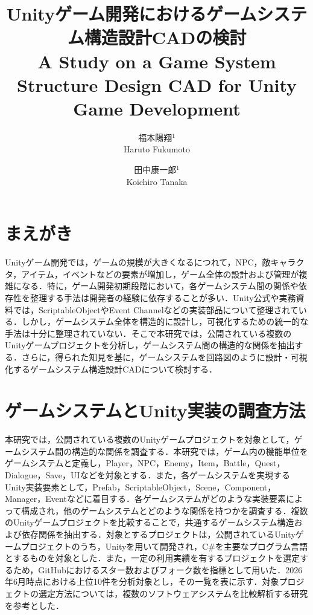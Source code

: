 \documentclass[twocolumn,a4paper,dvipdfmx]{ieicejsp}
\title{{\bf Unityゲーム開発におけるゲームシステム構造設計CADの検討}
  {\normalsize \\A Study on a Game System Structure Design CAD for Unity Game Development}}
\author{
    福本陽翔$^1$ \\ Haruto Fukumoto\and
    田中康一郎$^1$ \\ Koichiro Tanaka\\
  }
\begin{document}
\maketitle
\section{まえがき}
Unityゲーム開発では，ゲームの規模が大きくなるにつれて，NPC，敵キャラクタ，アイテム，イベントなどの要素が増加し，ゲーム全体の設計および管理が複雑になる．特に，ゲーム開発初期段階において，各ゲームシステム間の関係や依存性を整理する手法は開発者の経験に依存することが多い．Unity公式や実務資料では，ScriptableObjectやEvent Channelなどの実装部品について整理されている\cite{unity2025scriptableobjectjp}．しかし，ゲームシステム全体を構造的に設計し，可視化するための統一的な手法は十分に整理されていない．そこで本研究では，公開されている複数のUnityゲームプロジェクトを分析し，ゲームシステム間の構造的な関係を抽出する．さらに，得られた知見を基に，ゲームシステムを回路図のように設計・可視化するゲームシステム構造設計CADについて検討する．


\section{ゲームシステムとUnity実装の調査方法}
本研究では，公開されている複数のUnityゲームプロジェクトを対象として，ゲームシステム間の構造的な関係を調査する．本研究では，ゲーム内の機能単位をゲームシステムと定義し，Player，NPC，Enemy，Item，Battle，Quest，Dialogue，Save，UIなどを対象とする．また，各ゲームシステムを実現するUnity実装要素として，Prefab，ScriptableObject，Scene，Component，Manager，Eventなどに着目する．各ゲームシステムがどのような実装要素によって構成され，他のゲームシステムとどのような関係を持つかを調査する．複数のUnityゲームプロジェクトを比較することで，共通するゲームシステム構造および依存関係を抽出する．対象とするプロジェクトは，公開されているUnityゲームプロジェクトのうち，Unityを用いて開発され，C\#を主要なプログラム言語とするものを対象とした．また，一定の利用実績を有するプロジェクトを選定するため，GitHubにおけるスター数およびフォーク数を指標として用いた．2026年6月時点における上位10件を分析対象とし，その一覧を表に示す．対象プロジェクトの選定方法については，複数のソフトウェアシステムを比較解析する研究\cite{ullmann2023visualising}を参考とした．
\end{document}
